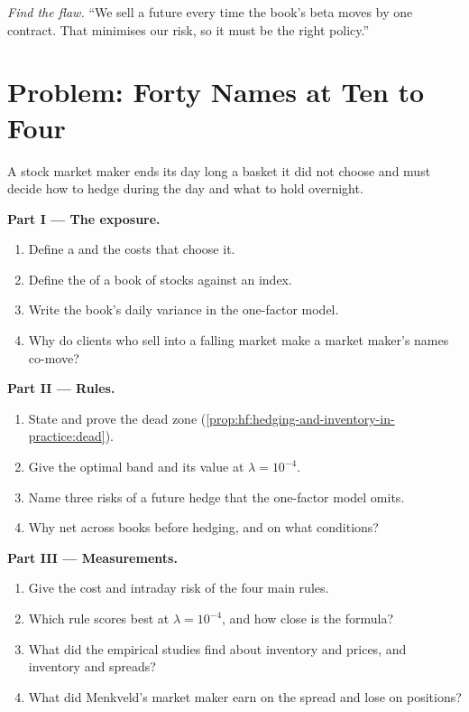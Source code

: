 \begin{exercise}[$\star\star\star$]\label{exo:hf:hedging-and-inventory-in-practice:8}
\emph{Find the flaw.} ``We sell a future every time the book's beta moves by one contract. That minimises our risk, so it must be the right policy.''
\end{exercise}

\section{Problem: Forty Names at Ten to Four}

\begin{problem}\label{pb:hf:hedging-and-inventory-in-practice:1}
A stock market maker ends its day long a basket it did not choose and must decide how to hedge during the day and what to hold overnight.

\medskip\noindent\textbf{Part I --- The exposure.}
\begin{enumerate}
\item Define a  and the costs that choose it.
\item Define the  of a book of stocks against an index.
\item Write the book's daily variance in the one-factor model.
\item Why do clients who sell into a falling market make a market maker's names co-move?
\end{enumerate}

\medskip\noindent\textbf{Part II --- Rules.}
\begin{enumerate}[resume]
\item State and prove the dead zone (\cref{prop:hf:hedging-and-inventory-in-practice:dead}).
\item Give the optimal band and its value at $\lambda=10^{-4}$.
\item Name three risks of a future hedge that the one-factor model omits.
\item Why net across books before hedging, and on what conditions?
\end{enumerate}

\medskip\noindent\textbf{Part III --- Measurements.}
\begin{enumerate}[resume]
\item Give the cost and intraday risk of the four main rules.
\item Which rule scores best at $\lambda=10^{-4}$, and how close is the formula?
\item What did the empirical studies find about inventory and prices, and inventory and spreads?
\item What did Menkveld's market maker earn on the spread and lose on positions?
\end{enumerate}


\end{problem}
